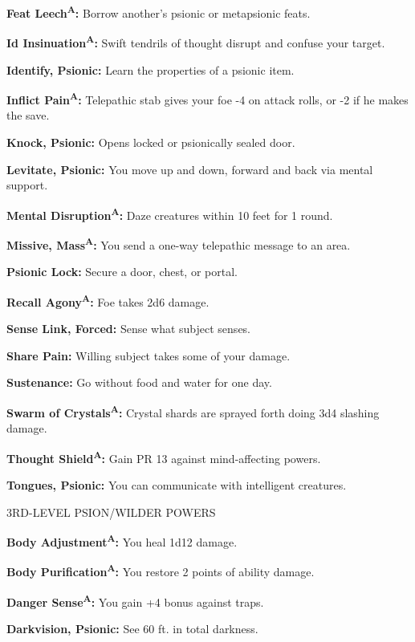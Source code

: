 \documentclass{article}
\begin{document}
\textbf{Feat Leech}\textsuperscript{\textbf{A}}\textbf{: }Borrow another's psionic 
or metapsionic feats.

\textbf{Id Insinuation}\textsuperscript{\textbf{A}}\textbf{: }Swift tendrils of 
thought disrupt and confuse your target.

\textbf{Identify, Psionic: }Learn the properties of a psionic item.

\textbf{Inflict Pain}\textsuperscript{\textbf{A}}\textbf{: }Telepathic stab gives 
your foe -4 on attack rolls, or -2 if he makes the save.

\textbf{Knock, Psionic: }Opens locked or psionically sealed door.

\textbf{Levitate, Psionic: }You move up and down, forward and back via mental support.

\textbf{Mental Disruption}\textsuperscript{\textbf{A}}\textbf{: }Daze creatures 
within 10 feet for 1 round.

\textbf{Missive, Mass}\textsuperscript{\textbf{A}}\textbf{: }You send a one-way 
telepathic message to an area.

\textbf{Psionic Lock: }Secure a door, chest, or portal.

\textbf{Recall Agony}\textsuperscript{\textbf{A}}\textbf{: }Foe takes 2d6 damage.

\textbf{Sense Link, Forced: }Sense what subject senses.

\textbf{Share Pain: }Willing subject takes some of your damage.

\textbf{Sustenance: }Go without food and water for one day.

\textbf{Swarm of Crystals}\textsuperscript{\textbf{A}}\textbf{: }Crystal shards 
are sprayed forth doing 3d4 slashing damage.

\textbf{Thought Shield}\textsuperscript{\textbf{A}}\textbf{: }Gain PR 13 against 
mind-affecting powers.

\textbf{Tongues, Psionic: }You can communicate with intelligent creatures.

3RD-LEVEL PSION/WILDER POWERS

\textbf{Body Adjustment}\textsuperscript{\textbf{A}}\textbf{: }You heal 1d12 damage.

\textbf{Body Purification}\textsuperscript{\textbf{A}}\textbf{: }You restore 2 
points of ability damage.

\textbf{Danger Sense}\textsuperscript{\textbf{A}}\textbf{: }You gain +4 bonus against 
traps.

\textbf{Darkvision, Psionic: }See 60 ft. in total darkness.
\end{document}
